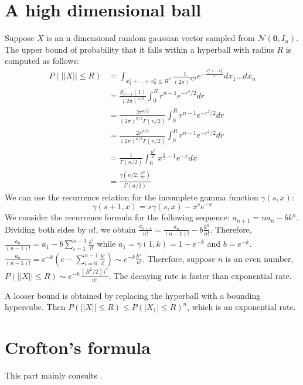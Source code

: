 \documentclass{article}
\begin{document}
\section{A high dimensional ball}
Suppose $X$ is an n dimensional random gaussian vector
sampled from
$\mathcal{N}(\bm{0}, I_n)$. The upper bound of probability that it
falls within a hyperball with radius $R$ is computed
as follows:
\begin{align*}
    P(||X||\leq R) &= \int_{x_1^2 + \dots + x_n^2 \leq R^2}
    \frac{1}{(2\pi)^{n/2}}
    e^{-\frac{x_1^2 + \dots x_n^2}{2}}
    dx_1 \dots dx_n\\
    &= \frac{S_{n-1}(1) }{(2\pi)^{n/2}}
    \int_0^R r^{n-1} e^{-r^2/2}dr
    \\
    &=\frac{2\pi^{n/2}}{(2\pi)^{n/2}\Gamma(n/2)}
    \int_0^R r^{n-1} e^{-r^2/2}dr \\
    &=\frac{2\pi^{n/2}}{(2\pi)^{n/2}\Gamma(n/2)}
    \int_0^R r^{n-1} e^{-r^2/2}dr \\
    &=\frac{1}{\Gamma(n/2)}
    \int_0^{\frac{R^2}{2}} x^{\frac{n}{2} - 1} e^{-x}dx\\
    &=\frac{\gamma(n/2, \frac{R^2}{2})}{\Gamma(n/2)}
\end{align*}
We can use the recurrence relation for the
incomplete gamma function $\gamma(s,x)$:
\begin{equation}
    \gamma(s+1, x)
    = s\gamma(s, x) - x^s e^{-x}
\end{equation}
We consider the recurrence formula for the
following sequence:
$a_{n+1} = n a_n - bk^n$.
Dividing both sides by $n!$, we obtain
$\frac{a_{n+1}}{n!} =
\frac{a_n}{(n-1)!} - b\frac{k^n}{n!}$.
Therefore, $\frac{a_n}{(n-1)!} = a_1 - b\sum_{i=1}^{n-1}
\frac{k^i}{i!}$ while $a_1 = \gamma(1, k)=1-e^{-k}$
and $b=e^{-k}$.
$\frac{a_n}{(n-1)!} = e^{-k}(e-\sum_{i=0}^{n-1} \frac{k^i}{i!})
\sim e^{-k}\frac{k^n}{n!}$.
Therefore, suppose $n$ is an even number,
$P(||X||\leq R) \sim e^{-k}\frac{(R^2/2))^n}{n!}$.
The decaying rate is faster than exponential rate.

A looser bound is obtained by replacing the hyperball
with a bounding hypercube. Then
$P(||X||\leq R) \leq P(|X_1|\leq R)^n$, which is an
exponential rate.

\section{Crofton's formula}
This part mainly consults \cite{crofton}.
\end{document}

